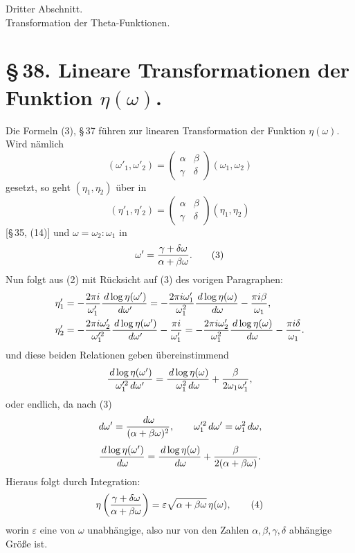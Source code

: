 \documentclass[11pt]{article}
\providecommand{\dd}{\,d}
\begin{document}
\begin{center}
{\large Dritter Abschnitt.}\\[0.7em]
{\Large Transformation der Theta-Funktionen.}
\end{center}

\section*{\S\,38. Lineare Transformationen der Funktion $\eta(\omega)$.}

Die Formeln (3), \S\,37 führen zur linearen Transformation der Funktion $\eta(\omega)$. Wird nämlich
\begin{equation}
(\omega'_1,\omega'_2)=
\begin{pmatrix}\alpha&\beta\\ \gamma&\delta\end{pmatrix}(\omega_1,\omega_2) 
\tag{1}
\end{equation}
gesetzt, so geht $(\eta_1,\eta_2)$ über in
\begin{equation}
(\eta'_1,\eta'_2)=
\begin{pmatrix}\alpha&\beta\\ \gamma&\delta\end{pmatrix}(\eta_1,\eta_2) 
\tag{2}
\end{equation}
[\S\,35, (14)] und $\omega=\omega_2:\omega_1$ in
\begin{equation}
\omega'={\gamma+\delta\omega\over \alpha+\beta\omega}. 
\tag{3}
\end{equation}
Nun folgt aus (2) mit Rücksicht auf (3) des vorigen Paragraphen:
\begin{align*}
\eta'_1&=-{2\pi i\over \omega'_1}{\dd\log\eta(\omega')\over\dd\omega'}
=-{2\pi i\omega'_1\over\omega_1^2}{\dd\log\eta(\omega)\over\dd\omega}-{\pi i\beta\over\omega_1},\\
\eta'_2&=-{2\pi i\omega'_2\over \omega_1'^2}{\dd\log\eta(\omega')\over\dd\omega'}-{\pi i\over\omega'_1}
=-{2\pi i\omega'_2\over\omega_1^2}{\dd\log\eta(\omega)\over\dd\omega}-{\pi i\delta\over\omega_1}.
\end{align*}
und diese beiden Relationen geben übereinstimmend
\[
 {\dd\log\eta(\omega')\over \omega_1'^2\dd\omega'}
 = {\dd\log\eta(\omega)\over\omega_1^2\dd\omega}
 +{\beta\over2\omega_1\omega_1'},
\]
oder endlich, da nach (3)
\[
\dd\omega'={\dd\omega\over(\alpha+\beta\omega)^2},
\qquad \omega_1'^2\dd\omega'=\omega_1^2\dd\omega,
\]
\[
{\dd\log\eta(\omega')\over\dd\omega}
={\dd\log\eta(\omega)\over\dd\omega}+{\beta\over2(\alpha+\beta\omega)}.
\]
Hieraus folgt durch Integration:
\begin{equation}
\eta\left({\gamma+\delta\omega\over\alpha+\beta\omega}\right)
=\varepsilon\sqrt{\alpha+\beta\omega}\,\eta(\omega),
\tag{4}
\end{equation}
worin $\varepsilon$ eine von $\omega$ unabhängige, also nur von den Zahlen $\alpha,\beta,\gamma,\delta$ abhängige Größe ist.
\end{document}

